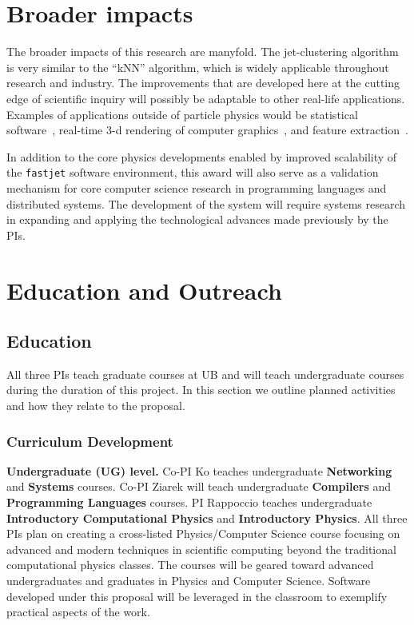\documentclass[times,11pt]{article}
\begin{document}
\section{Broader impacts}

The broader impacts of this research are manyfold. The jet-clustering
algorithm is very similar to the ``kNN'' algorithm, which is widely
applicable throughout research and industry. The improvements that are
developed here at the cutting edge of scientific inquiry will possibly be
adaptable to other real-life applications. Examples of applications
outside of particle physics would be statistical
software~\cite{statsoft}, real-time 3-d rendering of computer
graphics~\cite{opengl}, and feature extraction~\cite{featureextract}. 

In addition to the core physics developments enabled by improved
scalability of the {\tt fastjet} software environment, this award will
also serve as a validation mechanism for core computer science
research in programming languages and distributed systems.  The development
of the system will require systems research in expanding and applying
the technological advances made previously by the PIs.



\section{Education and Outreach}


\subsection{Education}
All three PIs teach graduate courses at UB and will teach undergraduate courses
during the duration of this project.  In this section we outline planned activities
and how they relate to the proposal.


\subsubsection{Curriculum Development}

{\bf Undergraduate (UG) level.}
Co-PI Ko teaches undergraduate {\bf Networking} and {\bf Systems} courses. Co-PI Ziarek will
teach undergraduate {\bf Compilers} and {\bf Programming Languages}
courses. 
PI Rappoccio teaches undergraduate 
{\bf Introductory Computational Physics} and {\bf Introductory Physics}. 
All three PIs plan on creating a cross-listed Physics/Computer Science course
focusing on advanced and modern techniques in scientific computing
beyond the traditional computational physics classes. The courses will be geared toward
advanced undergraduates and graduates in Physics and Computer Science.
Software developed under this proposal will be leveraged in the
classroom to exemplify practical aspects of the work.
\end{document}
